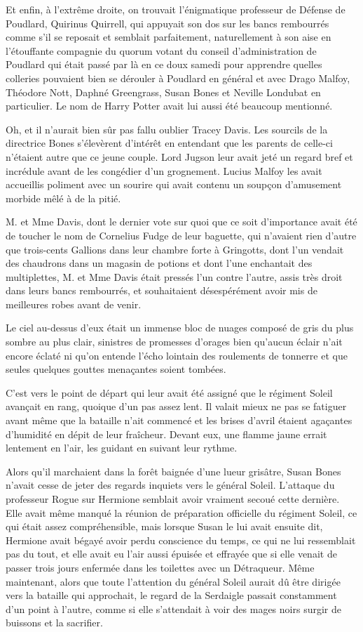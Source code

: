 Et enfin, à l'extrême droite, on trouvait l'énigmatique professeur de Défense de Poudlard, Quirinus Quirrell, qui appuyait son dos sur les bancs rembourrés comme s'il se reposait et semblait parfaitement, naturellement à son aise en l'étouffante compagnie du quorum votant du conseil d'administration de Poudlard qui était passé par là en ce doux samedi pour apprendre quelles colleries pouvaient bien se dérouler à Poudlard en général et avec Drago Malfoy, Théodore Nott, Daphné Greengrass, Susan Bones et Neville Londubat en particulier. Le nom de Harry Potter avait lui aussi été beaucoup mentionné.

Oh, et il n'aurait bien sûr pas fallu oublier Tracey Davis. Les sourcils de la directrice Bones s'élevèrent d'intérêt en entendant que les parents de celle-ci n'étaient autre que ce jeune couple. Lord Jugson leur avait jeté un regard bref et incrédule avant de les congédier d'un grognement. Lucius Malfoy les avait accueillis poliment avec un sourire qui avait contenu un soupçon d'amusement morbide mêlé à de la pitié.

M. et Mme Davis, dont le dernier vote sur quoi que ce soit d'importance avait été de toucher le nom de Cornelius Fudge de leur baguette, qui n'avaient rien d'autre que trois-cents Gallions dans leur chambre forte à Gringotts, dont l'un vendait des chaudrons dans un magasin de potions et dont l'une enchantait des multiplettes, M. et Mme Davis était pressés l'un contre l'autre, assis très droit dans leurs bancs rembourrés, et souhaitaient désespérément avoir mis de meilleures robes avant de venir.

Le ciel au-dessus d'eux était un immense bloc de nuages composé de gris du plus sombre au plus clair, sinistres de promesses d'orages bien qu'aucun éclair n'ait encore éclaté ni qu'on entende l'écho lointain des roulements de tonnerre et que seules quelques gouttes menaçantes soient tombées.

\later

C'est vers le point de départ qui leur avait été assigné que le régiment Soleil avançait en rang, quoique d'un pas assez lent. Il valait mieux ne pas se fatiguer avant même que la bataille n'ait commencé et les brises d'avril étaient agaçantes d'humidité en dépit de leur fraîcheur. Devant eux, une flamme jaune errait lentement en l'air, les guidant en suivant leur rythme.

Alors qu'il marchaient dans la forêt baignée d'une lueur grisâtre, Susan Bones n'avait cesse de jeter des regards inquiets vers le général Soleil. L'attaque du professeur Rogue sur Hermione semblait avoir vraiment secoué cette dernière. Elle avait même manqué la réunion de préparation officielle du régiment Soleil, ce qui était assez compréhensible, mais lorsque Susan le lui avait ensuite dit, Hermione avait bégayé avoir perdu conscience du temps, ce qui ne lui ressemblait pas du tout, et elle avait eu l'air aussi épuisée et effrayée que si elle venait de passer trois jours enfermée dans les toilettes avec un Détraqueur. Même maintenant, alors que toute l'attention du général Soleil aurait dû être dirigée vers la bataille qui approchait, le regard de la Serdaigle passait constamment d'un point à l'autre, comme si elle s'attendait à voir des mages noirs surgir de buissons et la sacrifier.

